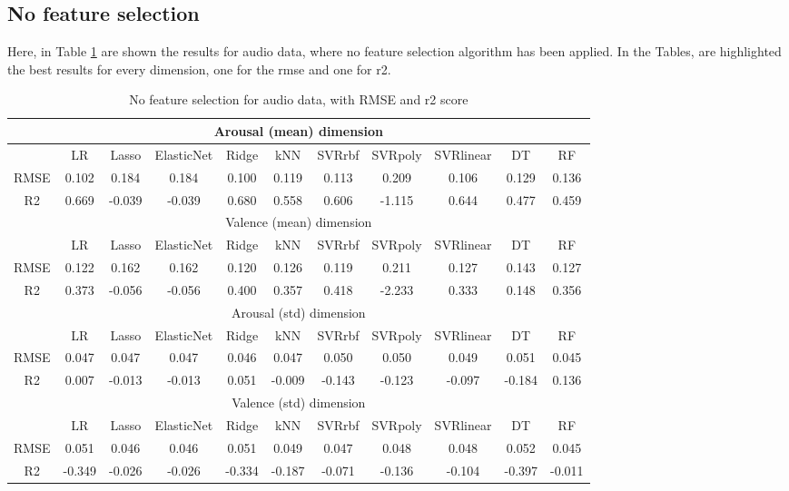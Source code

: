 \subsection{No feature selection}
Here, in Table \ref{table:audio_no_fs} are shown the results for audio data, where no feature selection algorithm has been applied. In the Tables, are highlighted the best results for every dimension, one for the \gls{rmse} and one for r2.
\\
\begin{table}[h!]
\begin{adjustwidth}{-3cm}{-1cm}
	\centering
	\begin{tabular}{|c|c|c|c|c|c|c|c|c|c|c|}
		\hline \multicolumn{11}{|c|}{Arousal (mean) dimension} \\
		\hline & LR & Lasso & ElasticNet & Ridge & kNN & SVRrbf & SVRpoly & SVRlinear & DT & RF \\
		\hline RMSE & 0.102 & 0.184 & 0.184 & \cellcolor{yellow}0.100 & 0.119 & 0.113 & 0.209 & 0.106 & 0.129 & 0.136 \\
		\hline R2 & \cellcolor{yellow}0.669 & -0.039 & -0.039 & 0.680 & 0.558 & 0.606 & -1.115 & 0.644 & 0.477 & 0.459 \\
		\hline \hline  \multicolumn{11}{|c|}{Valence (mean) dimension} \\
		\hline & LR & Lasso & ElasticNet & Ridge & kNN & SVRrbf & SVRpoly & SVRlinear & DT & RF \\
		\hline RMSE & 0.122 & 0.162 & 0.162 & 0.120 & 0.126 & \cellcolor{yellow}0.119 & 0.211 & 0.127 & 0.143 & 0.127 \\
		\hline R2 & 0.373 & -0.056 & -0.056 & 0.400 & 0.357 & \cellcolor{yellow}0.418 & -2.233 & 0.333 & 0.148 & 0.356 \\
		\hline \hline  \multicolumn{11}{|c|}{Arousal (std) dimension} \\
		\hline & LR & Lasso & ElasticNet & Ridge & kNN & SVRrbf & SVRpoly & SVRlinear & DT & RF \\
		\hline RMSE & 0.047 & 0.047 & 0.047 & \cellcolor{yellow}0.046 & 0.047 & 0.050 & 0.050 & 0.049 & 0.051 & 0.045 \\
		\hline R2 & 0.007 & -0.013 & -0.013 & 0.051 & -0.009 & -0.143 & -0.123 & -0.097 & -0.184 & \cellcolor{yellow}0.136 \\
		\hline \hline  \multicolumn{11}{|c|}{Valence (std) dimension} \\
		\hline & LR & Lasso & ElasticNet & Ridge & kNN & SVRrbf & SVRpoly & SVRlinear & DT & RF \\
		\hline RMSE & 0.051 & \cellcolor{yellow}0.046 & \cellcolor{yellow}0.046 & 0.051 & 0.049 & 0.047 & 0.048 & 0.048 & 0.052 & 0.045 \\
		\hline R2 & -0.349 & -0.026 & -0.026 & -0.334 & -0.187 & -0.071 & -0.136 & -0.104 & -0.397 & \cellcolor{yellow}-0.011 \\		
		\hline
	\end{tabular}
	\end{adjustwidth}
	\caption{No feature selection for audio data, with RMSE and r2 score}
	\label{table:audio_no_fs}
\end{table}
